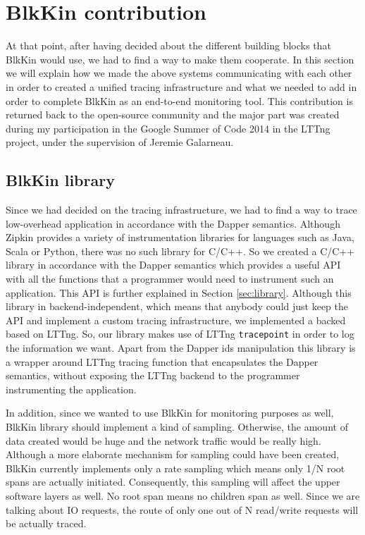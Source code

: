 \section{BlkKin contribution}\label{sec:contribution}

At that point, after having decided about the different building blocks that
BlkKin would use, we had to find a way to make them cooperate.  In this section
we will explain how we made the above systems communicating with each other in
order to created a unified tracing infrastructure and what we needed to add in
order to complete BlkKin as an end-to-end monitoring tool. This contribution is
returned back to the open-source community and the major part was created during
my participation in the Google Summer of Code 2014 in the LTTng project, under
the supervision of Jeremie Galarneau.

\subsection{BlkKin library}
Since we had decided on the tracing infrastructure, we had to find a way to
trace low-overhead application in accordance with the Dapper semantics. Although
Zipkin provides a variety of instrumentation libraries for languages such as
Java, Scala or Python, there was no such library for C/C++. So we created a
C/C++ library in accordance with the Dapper semantics which provides a useful
API with all the functions that a programmer would need to instrument such an
application. This API is further explained in Section \ref{sec:library}.
Although this library in backend-independent, which means that anybody could
just keep the API and implement a custom tracing infrastructure, we implemented
a backed based on LTTng. So, our library makes use of LTTng \texttt{tracepoint}
in order to log the information we want. Apart from the Dapper ids manipulation
this library is a wrapper around LTTng tracing function that encapsulates the
Dapper semantics, without exposing the LTTng backend to the programmer
instrumenting the application.

In addition, since we wanted to use BlkKin for monitoring purposes as well,
BlkKin library should implement a kind of sampling. Otherwise, the amount of
data created would be huge and the network traffic would be really high.
Although a more elaborate mechanism for sampling could have been created, BlkKin
currently implements only a rate sampling which means only 1/N root spans are
actually initiated. Consequently, this sampling will affect the upper software
layers as well. No root span means no children span as well. Since we are
talking about IO requests, the route of only one out of N read/write requests
will be actually traced.


